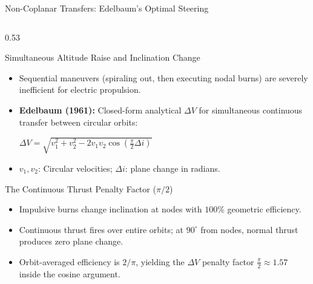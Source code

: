 \documentclass[aspectratio=169, 10pt]{beamer}
\begin{document}
\begin{frame}{Non-Coplanar Transfers: Edelbaum's Optimal Steering}
    \begin{columns}[T]
        \begin{column}{0.53\textwidth}
            \begin{block}{Simultaneous Altitude Raise and Inclination Change}
                \scriptsize
                \begin{itemize}\setlength{\itemsep}{1.2pt}\setlength{\topsep}{0pt}
                    \item Sequential maneuvers (spiraling out, then executing nodal burns) are severely inefficient for electric propulsion.
                    \item \textbf{Edelbaum (1961):} Closed-form analytical $\Delta V$ for simultaneous continuous transfer between circular orbits:
                    \par\vspace{1.5pt}
                    {\centering $\displaystyle \Delta V = \sqrt{v_1^2 + v_2^2 - 2v_1 v_2 \cos\left(\frac{\pi}{2}\Delta i\right)}$ \par}
                    \vspace{1.5pt}
                    \item $v_1, v_2$: Circular velocities; $\Delta i$: plane change in radians.
                \end{itemize}
            \end{block}

            \vspace{-0.22cm}

            \begin{block}{The Continuous Thrust Penalty Factor ($\pi/2$)}
                \scriptsize
                \begin{itemize}\setlength{\itemsep}{1.2pt}\setlength{\topsep}{0pt}
                    \item Impulsive burns change inclination at nodes with $100\%$ geometric efficiency.
                    \item Continuous thrust fires over entire orbits; at $90^\circ$ from nodes, normal thrust produces zero plane change.
                    \item Orbit-averaged efficiency is $2/\pi$, yielding the $\Delta V$ penalty factor $\frac{\pi}{2} \approx 1.57$ inside the cosine argument.
                \end{itemize}
            \end{block}
        \end{column}


\end{columns}
\end{frame}
\end{document}
